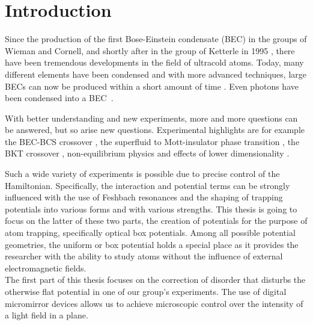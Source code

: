 

\chapter{Introduction}

Since the production of the first Bose-Einstein condensate (BEC) in the groups of Wieman and Cornell, and shortly after in the group of Ketterle in 1995 \cite{bec1,bec2}, there have been tremendous developments in the field of ultracold atoms. Today, many different elements have been condensed \cite{PhysRevLett.78.985,PhysRevLett.81.3811,PhysRevLett.85.1795,Modugno1320,PhysRevLett.86.3459,PhysRevLett.91.040404,Weber232,PhysRevLett.94.160401,PhysRevLett.103.130401,PhysRevA.82.011608,PhysRevLett.108.210401,PhysRevLett.107.190401} and with more advanced techniques, large BECs can now be produced within a short amount of time \cite{Rudolph2015,PhysRevA.95.013609}. Even photons have been condensed into a BEC~\cite{photonbec}.

With better understanding and new experiments, more and more questions can be answered, but so arise new questions. Experimental highlights are for example the BEC-BCS crossover \cite{PhysRevLett.92.120403,PhysRevLett.92.040403}, the superfluid to Mott-insulator phase transition \cite{mottInsulator}, the BKT crossover \cite{bktCrossover}, non-equilibrium physics \cite{nonEquilibrium} and effects of lower dimensionality \cite{oneDim1,oneDim2}.

Such a wide variety of experiments is possible due to precise control of the Hamiltonian. Specifically, the interaction and potential terms can be strongly influenced with the use of Feshbach resonances \cite{RevModPhys.82.1225} and the shaping of trapping potentials into various forms and with various strengths.
This thesis is going to focus on the latter of these two parts, the creation of potentials for the purpose of atom trapping, specifically optical box potentials. Among all possible potential geometries, the uniform or box potential holds a special place as it provides the researcher with the ability to study atoms without the influence of external electromagnetic fields.\\[\baselineskip]
The first part of this thesis focuses on the correction of disorder that disturbs the otherwise flat potential in one of our group's experiments. The use of digital micromirror devices allows us to achieve microscopic control over the intensity of a light field in a plane.

